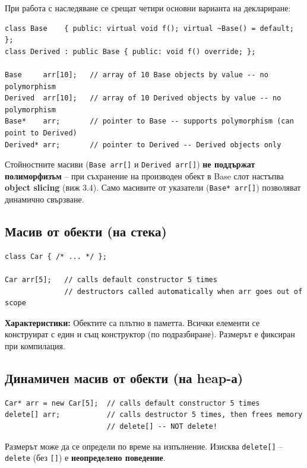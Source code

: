 \documentclass{scrartcl}
\begin{document}
\begin{FlushLeft}
При работа с наследяване се срещат четири основни варианта на деклариране:

\begin{lstlisting}
class Base    { public: virtual void f(); virtual ~Base() = default; };
class Derived : public Base { public: void f() override; };

Base     arr[10];   // array of 10 Base objects by value -- no polymorphism
Derived  arr[10];   // array of 10 Derived objects by value -- no polymorphism
Base*    arr;       // pointer to Base -- supports polymorphism (can point to Derived)
Derived* arr;       // pointer to Derived -- Derived objects only
\end{lstlisting}

Стойностните масиви (\texttt{Base arr[]} и \texttt{Derived arr[]}) \textbf{не поддържат полиморфизъм} -- при съхранение на производен обект в Base слот настъпва \textbf{object slicing} (виж 3.4). Само масивите от указатели (\texttt{Base* arr[]}) позволяват динамично свързване.

\subsection{Масив от обекти (на стека)}

\begin{lstlisting}
class Car { /* ... */ };

Car arr[5];   // calls default constructor 5 times
              // destructors called automatically when arr goes out of scope
\end{lstlisting}

\textbf{Характеристики:} Обектите са плътно в паметта. Всички елементи се конструират с един и същ конструктор (по подразбиране). Размерът е фиксиран при компилация.

\subsection{Динамичен масив от обекти (на heap-а)}

\begin{lstlisting}
Car* arr = new Car[5];  // calls default constructor 5 times
delete[] arr;           // calls destructor 5 times, then frees memory
                        // delete[] -- NOT delete!
\end{lstlisting}

Размерът може да се определи по време на изпълнение. Изисква \texttt{delete[]} -- \texttt{delete} (без \texttt{[]}) е \textbf{неопределено поведение}.


\end{FlushLeft}
\end{document}
